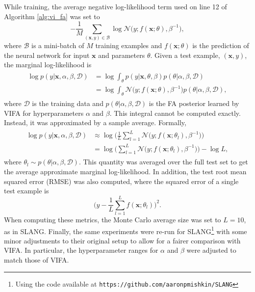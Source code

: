 \documentclass[msc,deptreport.inf]{infthesis} %
\newcommand{\matr}[1]{\mathbf{#1}}
\begin{document}
While training, the average negative log-likelihood term used on line 12 of Algorithm \ref{alg:vi_fa} was set to
\begin{equation}\label{eqn:train_nll}
	-\frac{1}{M} \sum_{(\matr{x}, y) \in \mathcal{B}} \log \mathcal{N}\big(y; f(\matr{x}; \theta), \beta^{-1}\big),
\end{equation}
where $\mathcal{B}$ is a mini-batch of $M$ training examples and $f(\matr{x}; \theta)$ is the prediction of the neural network for input $\matr{x}$ and parameters $\theta$. Given a test example, $(\matr{x}, y)$, the marginal log-likelihood is
\begin{align}
\begin{split}
	\log p(y | \matr{x}, \alpha, \beta, \mathcal{D}) 
	& = \log \int_\theta p(y | \matr{x}, \theta, \beta) p(\theta | \alpha, \beta, \mathcal{D}) \\
	& = \log \int_\theta \mathcal{N}\big(y; f(\matr{x}; \theta), \beta^{-1}\big) p(\theta | \alpha, \beta, \mathcal{D}),
\end{split}
\end{align}
where $\mathcal{D}$ is the training data and $p(\theta | \alpha, \beta, \mathcal{D})$ is the FA posterior learned by VIFA for hyperparameters $\alpha$ and $\beta$. This integral cannot be computed exactly. Instead, it was approximated by a sample average. Formally, 
\begin{align}
\begin{split}
	\log p(y | \matr{x}, \alpha, \beta, \mathcal{D}) 
	& \approx \log \Bigg( \frac{1}{L} \sum_{l=1}^L \mathcal{N}\big(y; f(\matr{x}; \theta_l), \beta^{-1}\big) \Bigg) \\
	& = \log \Bigg( \sum_{l=1}^L \mathcal{N}\big(y; f(\matr{x}; \theta_l), \beta^{-1}\big) \Bigg) - \log L,
\end{split}
\end{align}
where $\theta_l \sim p(\theta | \alpha, \beta, \mathcal{D})$. This quantity was averaged over the full test set to get the average approximate marginal log-likelihood. In addition, the test root mean squared error (RMSE) was also computed, where the squared error of a single test example is
\begin{equation}
	\Bigg(y - \frac{1}{L} \sum_{l=1}^L f(\matr{x}; \theta_l)\Bigg)^2.
\end{equation}
When computing these metrics, the Monte Carlo average size was set to $L=10$, as in SLANG. Finally, the same experiments were re-run for SLANG\footnote{Using the code available at \texttt{https://github.com/aaronpmishkin/SLANG}} with some minor adjustments to their original setup to allow for a fairer comparison with VIFA. In particular, the hyperparameter ranges for $\alpha$ and $\beta$ were adjusted to match those of VIFA. 
\end{document}
